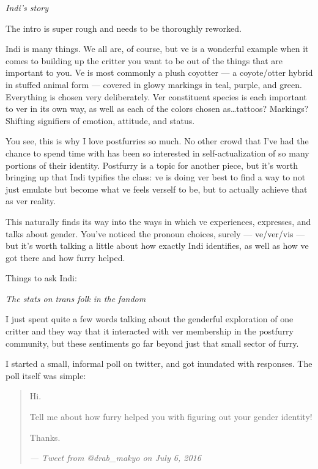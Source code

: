 \secdiv

\textit{Indi's story}

\begin{center}
  The intro is super rough and needs to be thoroughly reworked.
\end{center}

Indi is many things.  We all are, of course, but ve is a wonderful example when it comes to building up the critter you want to be out of the things that are important to you.  Ve is most commonly a plush coyotter --- a coyote/otter hybrid in stuffed animal form --- covered in glowy markings in teal, purple, and green. Everything is chosen very deliberately.  Ver constituent species is each important to ver in its own way, as well as each of the colors chosen as\ldots{}tattoos?  Markings?  Shifting signifiers of emotion, attitude, and status.

You see, this is why I love postfurries so much.  No other crowd that I've had the chance to spend time with has been so interested in self-actualization of so many portions of their identity.  Postfurry is a topic for another piece, but it's worth bringing up that Indi typifies the class: ve is doing ver best to find a way to not just emulate but become what ve feels verself to be, but to actually achieve that as ver reality.

This naturally finds its way into the ways in which ve experiences, expresses, and talks about gender.  You've noticed the pronoun choices, surely --- ve/ver/vis --- but it's worth talking a little about how exactly Indi identifies, as well as how ve got there and how furry helped.


\begin{center}
  Things to ask Indi:

\end{center}

\secdiv

\textit{The stats on trans folk in the fandom}

I just spent quite a few words talking about the genderful exploration of one critter and they way that it interacted with ver membership in the postfurry community, but these sentiments go far beyond just that small sector of furry.

I started a small, informal poll on twitter, and got inundated with responses.  The poll itself was simple:

\begin{quotation}
  Hi.

  Tell me about how furry helped you with figuring out your gender identity!

  Thanks.

  \textit{--- Tweet from @drab\_makyo on July 6, 2016}
\end{quotation}

